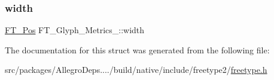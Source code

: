 \subsubsection{\texorpdfstring{width}{width}}
{\footnotesize\ttfamily \hyperlink{ftimage_8h_af5f230f4b253d4c7715fd2e595614c90}{F\+T\+\_\+\+Pos} F\+T\+\_\+\+Glyph\+\_\+\+Metrics\+\_\+\+::width}



The documentation for this struct was generated from the following file\+:\begin{DoxyCompactItemize}
\item 
src/packages/\+Allegro\+Deps..../build/native/include/freetype2/\hyperlink{freetype_8h}{freetype.\+h}\end{DoxyCompactItemize}
